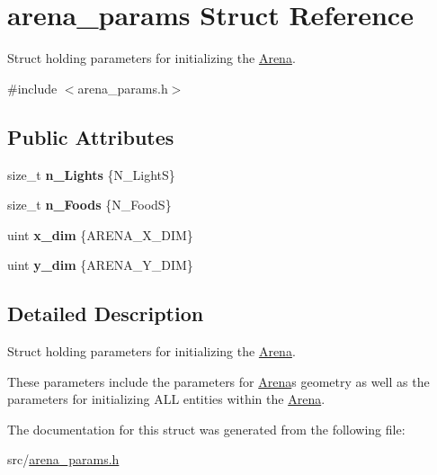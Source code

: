 \hypertarget{structarena__params}{}\section{arena\+\_\+params Struct Reference}
\label{structarena__params}


Struct holding parameters for initializing the \hyperlink{classArena}{Arena}.  




{\ttfamily \#include $<$arena\+\_\+params.\+h$>$}

\subsection*{Public Attributes}
\begin{DoxyCompactItemize}
\item 
size\+\_\+t {\bfseries n\+\_\+\+Lights} \{N\+\_\+\+LightS\}\hypertarget{structarena__params_a1e0a1b33b5f61550df263333c565a499}{}\label{structarena__params_a1e0a1b33b5f61550df263333c565a499}

\item 
size\+\_\+t {\bfseries n\+\_\+\+Foods} \{N\+\_\+\+FoodS\}\hypertarget{structarena__params_ab1a1654d72e5a2644eb3335b98328570}{}\label{structarena__params_ab1a1654d72e5a2644eb3335b98328570}

\item 
uint {\bfseries x\+\_\+dim} \{A\+R\+E\+N\+A\+\_\+\+X\+\_\+\+D\+IM\}\hypertarget{structarena__params_afa86b434ed8ea5a4fe9ae14ae1438e8f}{}\label{structarena__params_afa86b434ed8ea5a4fe9ae14ae1438e8f}

\item 
uint {\bfseries y\+\_\+dim} \{A\+R\+E\+N\+A\+\_\+\+Y\+\_\+\+D\+IM\}\hypertarget{structarena__params_ab5d50b9affa9c753c15e1d6f088824af}{}\label{structarena__params_ab5d50b9affa9c753c15e1d6f088824af}

\end{DoxyCompactItemize}


\subsection{Detailed Description}
Struct holding parameters for initializing the \hyperlink{classArena}{Arena}. 

These parameters include the parameters for \hyperlink{classArena}{Arena}\textquotesingle{}s geometry as well as the parameters for initializing A\+LL entities within the \hyperlink{classArena}{Arena}. 

The documentation for this struct was generated from the following file\+:\begin{DoxyCompactItemize}
\item 
src/\hyperlink{arena__params_8h}{arena\+\_\+params.\+h}\end{DoxyCompactItemize}
